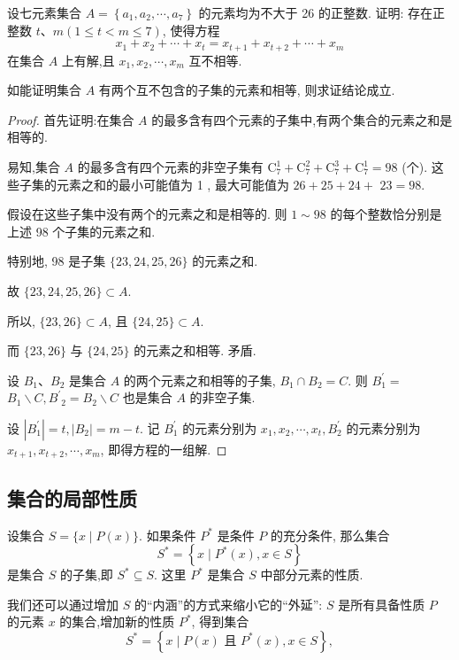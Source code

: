 \begin{example}
	设七元素集合 $A=\left\{a_{1}, a_{2}, \cdots, a_{7}\right\}$ 的元素均为不大于 26 的正整数. 证明: 存在正整数 $t 、 m(1 \leqslant t<m \leqslant 7)$, 使得方程
	$$
		x_{1}+x_{2}+\cdots+x_{t}=x_{t+1}+x_{t+2}+\cdots+x_{m}
	$$
	在集合 $A$ 上有解,且 $x_{1}, x_{2}, \cdots, x_{m}$ 互不相等.
\end{example}
\begin{analysis}
	如能证明集合 $A$ 有两个互不包含的子集的元素和相等, 则求证结论成立.
\end{analysis}
\begin{proof}
	首先证明:在集合 $A$ 的最多含有四个元素的子集中,有两个集合的元素之和是相等的.

	易知,集合 $A$ 的最多含有四个元素的非空子集有 $\mathrm{C}_{7}^{1}+\mathrm{C}_{7}^{2}+\mathrm{C}_{7}^{3}+\mathrm{C}_{7}^{1}=98$ (个). 这些子集的元素之和的最小可能值为 1 , 最大可能值为 $26+25+24+$ $23=98$.

	假设在这些子集中没有两个的元素之和是相等的. 则 $1 \sim 98$ 的每个整数恰分别是上述 98 个子集的元素之和.

	特别地, 98 是子集 $\{23,24,25,26\}$ 的元素之和.

	故 $\{23,24,25,26\} \subset A$.

	所以, $\{23,26\} \subset A$, 且 $\{24,25\} \subset A$.

	而 $\{23,26\}$ 与 $\{24,25\}$ 的元素之和相等. 矛盾.

	设 $B_{1} 、 B_{2}$ 是集合 $A$ 的两个元素之和相等的子集, $B_{1} \cap B_{2}=C$. 则 $B_{1}^{\prime}=$ $B_{1} \backslash C, B^{\prime}{ }_{2}=B_{2} \backslash C$ 也是集合 $A$ 的非空子集.

	设 $\left|B_{1}^{\prime}\right|=t,\left|B_{2}\right|=m-t$. 记 $B_{1}^{\prime}$ 的元素分别为 $x_{1}, x_{2}, \cdots, x_{t}, B_{2}^{\prime}$ 的元素分别为 $x_{t+1}, x_{t+2}, \cdots, x_{m}$, 即得方程的一组解.
\end{proof}

\subsection{集合的局部性质}
设集合 $S=\{x \mid P(x)\}$. 如果条件 $P^{*}$ 是条件 $P$ 的充分条件, 那么集合
$$
	S^{*}=\left\{x \mid P^{*}(x), x \in S\right\}
$$
是集合 $S$ 的子集,即 $S^{*} \subseteq S$. 这里 $P^{*}$ 是集合 $S$ 中部分元素的性质.

我们还可以通过增加 $S$ 的“内涵”的方式来缩小它的“外延”: $S$ 是所有具备性质 $P$ 的元素 $x$ 的集合,增加新的性质 $P^{*}$, 得到集合
$$
	S^{*}=\left\{x \mid P(x) \text { 且 } P^{*}(x), x \in S\right\},
$$

